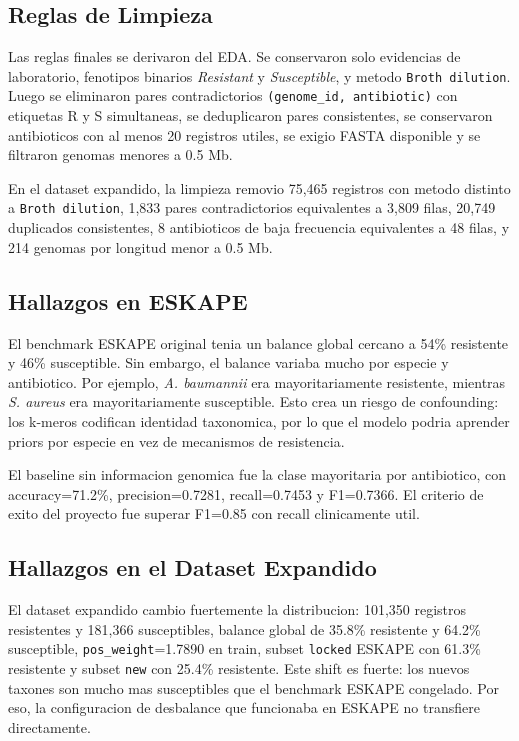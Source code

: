 \documentclass[journal,transmag]{../ieee_latex_template/IEEEtran}
\begin{document}
\subsection{Reglas de Limpieza}
Las reglas finales se derivaron del EDA. Se conservaron solo evidencias de laboratorio, fenotipos binarios \textit{Resistant} y \textit{Susceptible}, y metodo \texttt{Broth dilution}. Luego se eliminaron pares contradictorios \texttt{(genome\_id, antibiotic)} con etiquetas R y S simultaneas, se deduplicaron pares consistentes, se conservaron antibioticos con al menos 20 registros utiles, se exigio FASTA disponible y se filtraron genomas menores a 0.5 Mb.

En el dataset expandido, la limpieza removio 75,465 registros con metodo distinto a \texttt{Broth dilution}, 1,833 pares contradictorios equivalentes a 3,809 filas, 20,749 duplicados consistentes, 8 antibioticos de baja frecuencia equivalentes a 48 filas, y 214 genomas por longitud menor a 0.5 Mb.

\subsection{Hallazgos en ESKAPE}
El benchmark ESKAPE original tenia un balance global cercano a 54\% resistente y 46\% susceptible. Sin embargo, el balance variaba mucho por especie y antibiotico. Por ejemplo, \textit{A. baumannii} era mayoritariamente resistente, mientras \textit{S. aureus} era mayoritariamente susceptible. Esto crea un riesgo de confounding: los k-meros codifican identidad taxonomica, por lo que el modelo podria aprender priors por especie en vez de mecanismos de resistencia.

El baseline sin informacion genomica fue la clase mayoritaria por antibiotico, con accuracy=71.2\%, precision=0.7281, recall=0.7453 y F1=0.7366. El criterio de exito del proyecto fue superar F1=0.85 con recall clinicamente util.

\subsection{Hallazgos en el Dataset Expandido}
El dataset expandido cambio fuertemente la distribucion: 101,350 registros resistentes y 181,366 susceptibles, balance global de 35.8\% resistente y 64.2\% susceptible, \texttt{pos\_weight}=1.7890 en train, subset \texttt{locked} ESKAPE con 61.3\% resistente y subset \texttt{new} con 25.4\% resistente. Este shift es fuerte: los nuevos taxones son mucho mas susceptibles que el benchmark ESKAPE congelado. Por eso, la configuracion de desbalance que funcionaba en ESKAPE no transfiere directamente.
\end{document}
